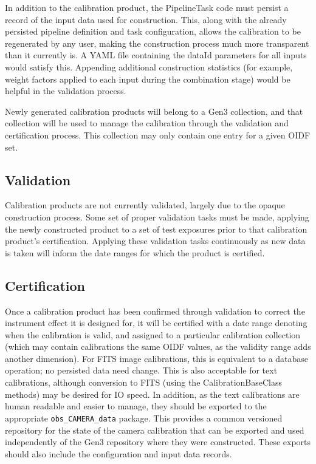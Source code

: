 \documentclass[DM,authoryear,toc]{lsstdoc}
\begin{document}
In addition to the calibration product, the PipelineTask code must
persist a record of the input data used for construction.  This, along
with the already persisted pipeline definition and task configuration,
allows the calibration to be regenerated by any user, making the
construction process much more transparent than it currently is.  A
YAML file containing the dataId parameters for all inputs would
satisfy this.  Appending additional construction statistics (for
example, weight factors applied to each input during the combination
stage) would be helpful in the validation process.

Newly generated calibration products will belong to a Gen3 collection,
and that collection will be used to manage the calibration through the
validation and certification process.  This collection may only
contain one entry for a given OIDF set.

\subsection{Validation}

Calibration products are not currently validated, largely due to the
opaque construction process.  Some set of proper validation tasks must
be made, applying the newly constructed product to a set of test
exposures prior to that calibration product's certification.  Applying
these validation tasks continuously as new data is taken will inform
the date ranges for which the product is certified.

\subsection{Certification}

Once a calibration product has been confirmed through validation to
correct the instrument effect it is designed for, it will be certified
with a date range denoting when the calibration is valid, and assigned
to a particular calibration collection (which may contain calibrations
the same OIDF values, as the validity range adds another dimension).
For FITS image calibrations, this is equivalent to a database
operation; no persisted data need change.  This is also acceptable for
text calibrations, although conversion to FITS (using the
CalibrationBaseClass methods) may be desired for IO speed. In
addition, as the text calibrations are human readable and easier to
manage, they should be exported to the appropriate \verb|obs_CAMERA_data|
package.  This provides a common versioned repository for the state of
the camera calibration that can be exported and used independently of
the Gen3 repository where they were constructed.  These exports should
also include the configuration and input data records.
\end{document}
